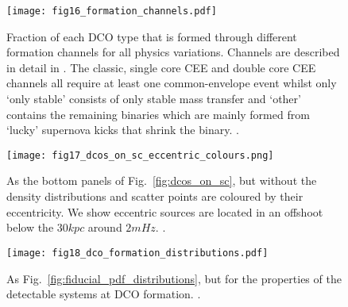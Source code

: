 \begin{figure}[p]
    \centering
    \texttt{[image: fig16\_formation\_channels.pdf]}
    \caption{Fraction of each DCO type that is formed through different formation channels for all physics variations. Channels are described in detail in \citet{Broekgaarden+2021}. The classic, single core CEE and double core CEE channels all require at least one common-envelope event whilst only `only stable' consists of only stable mass transfer and `other' contains the remaining binaries which are mainly formed from `lucky' supernova kicks that shrink the binary. \href{https://github.com/TomWagg/detecting-DCOs-in-LISA/blob/main/paper/figures/fig16_formation_channels.pdf}{\faFileImage} \href{https://github.com/TomWagg/detecting-DCOs-in-LISA/blob/main/paper/figure_notebooks/formation_channels.ipynb}{\faBook}.}
    \label{fig:formation_channels}
\end{figure}

\begin{figure*}[p]
    \centering
    \texttt{[image: fig17\_dcos\_on\_sc\_eccentric\_colours.png]}
    \caption{As the bottom panels of Fig.~\ref{fig:dcos_on_sc}, but without the density distributions and scatter points are coloured by their eccentricity. We show eccentric sources are located in an offshoot below the $30 \unit{kpc}$ around $2 \unit{mHz}$. \href{https://github.com/TomWagg/detecting-DCOs-in-LISA/blob/main/paper/figures/fig17_dcos_on_sc_eccentric_colours.png}{\faFileImage} \href{https://github.com/TomWagg/detecting-DCOs-in-LISA/blob/main/paper/figure_notebooks/sensitivity_curve.ipynb}{\faBook}.}
    \label{fig:dcos_on_sc_ecc_col}

    \texttt{[image: fig18\_dco\_formation\_distributions.pdf]}
    \caption{As Fig.~\ref{fig:fiducial_pdf_distributions}, but for the properties of the detectable systems at DCO formation. \href{https://github.com/TomWagg/detecting-DCOs-in-LISA/blob/main/paper/figures/fig18_dco_formation_distributions.pdf}{\faFileImage} \href{https://github.com/TomWagg/detecting-DCOs-in-LISA/blob/main/paper/figure_notebooks/fiducial.ipynb}{\faBook}.}
    \label{fig:dco_formation_properties}

\end{figure*}
